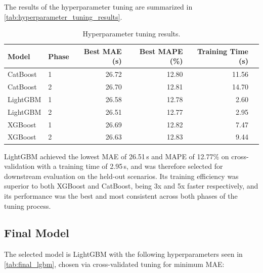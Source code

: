 The results of the hyperparameter tuning are summarized in \autoref{tab:hyperparameter_tuning_results}.

\begin{table}[htbp]
    \centering
    \caption{Hyperparameter tuning results.}
    \label{tab:hyperparameter_tuning_results}
    \begin{tabular}{llrrrr}
        \toprule
        \textbf{Model} & \textbf{Phase} & \textbf{Best MAE (s)} & \textbf{Best MAPE (\%)} & \textbf{Training Time (s)} \\
        \midrule
        CatBoost & 1 & 26.72 & 12.80 & 11.56 \\
        CatBoost & 2 & 26.70 & 12.81 & 14.70 \\
        LightGBM & 1 & 26.58 & 12.78 & 2.60 \\
        LightGBM & 2 & 26.51 & 12.77 & 2.95 \\
        XGBoost & 1 & 26.69 & 12.82 & 7.47 \\
        XGBoost & 2 & 26.63 & 12.83 & 9.44 \\
        \bottomrule
    \end{tabular}
\end{table}

LightGBM achieved the lowest MAE of 26.51\,s and MAPE of 12.77\% on cross-validation with a training time of 2.95\,s, and was therefore selected for downstream evaluation on the held-out scenarios.
Its training efficiency was superior to both XGBoost and CatBoost, being 3x and 5x faster respectively, and its performance was the best and most consistent across both phases of the tuning process.

\subsection{Final Model}
The selected model is LightGBM with the following hyperparameters seen in \autoref{tab:final_lgbm}, chosen via cross-validated tuning for minimum MAE:

